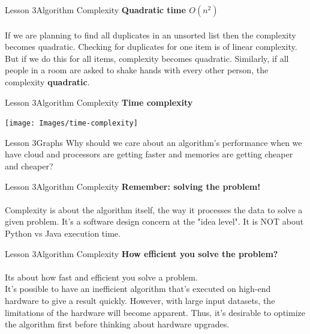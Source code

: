 \documentclass[aspectratio=1610]{beamer}
\begin{document}
\begin{frame}{Lesson 3}{Algorithm Complexity}
\LARGE
\textbf{Quadratic time $O(n^2)$}\\~\\
If we are planning to find all duplicates in an unsorted list then the complexity
becomes quadratic. Checking for duplicates for one item is of linear complexity. But
if we do this for all items, complexity becomes quadratic. Similarly, if all people in
a room are asked to shake hands with every other person, the complexity 
\textbf{quadratic}.
\end{frame}


\begin{frame}{Lesson 3}{Algorithm Complexity}
\LARGE
\textbf{Time complexity}\\
\begin{center}
\texttt{[image: Images/time-complexity]}
\end{center}
\end{frame}



\begin{frame}{Lesson 3}{Graphs}
\huge
Why should we care about an algorithm's performance when we have cloud and processors are getting 
faster and memories are getting cheaper and cheaper?
\end{frame}



\begin{frame}{Lesson 3}{Algorithm Complexity}
\LARGE
\textbf{Remember: solving the problem!}\\~\\
Complexity is about the algorithm itself, the way it processes the data to solve a
given problem. It's a software design concern at the "idea level". It is NOT about
Python vs Java execution time.
\end{frame}



\begin{frame}{Lesson 3}{Algorithm Complexity}
\LARGE
\textbf{How efficient you solve the problem?}\\~\\
Its about how fast and efficient you solve a problem.\\
It's possible to have an inefficient algorithm that's executed on high-end hardware to
give a result quickly. However, with large input datasets, the limitations of the
hardware will become apparent. Thus, it's desirable to optimize the algorithm first
before thinking about hardware upgrades.
\end{frame}
\end{document}
